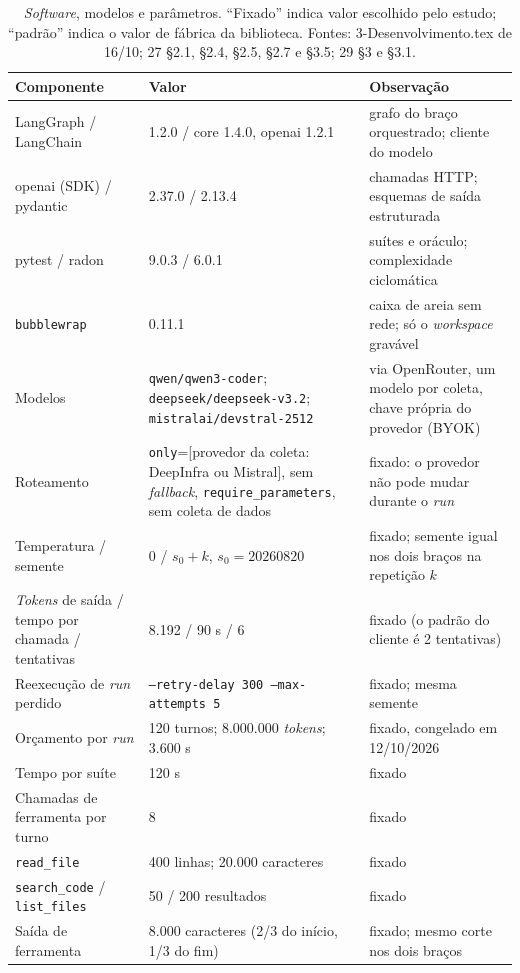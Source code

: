 \begin{table}[t]
\centering
\caption{\textit{Software}, modelos e parâmetros. ``Fixado'' indica valor escolhido pelo estudo; ``padrão'' indica o valor de fábrica da biblioteca. Fontes: 3-Desenvolvimento.tex de 16/10; 27 \S2.1, \S2.4, \S2.5, \S2.7 e \S3.5; 29 \S3 e \S3.1.}
\label{tab-parametros}
\small
\begin{tabular}{p{4.8cm}p{4.6cm}p{5.6cm}}
\toprule
Componente & Valor & Observação \\
\midrule
LangGraph / LangChain & 1.2.0 / core 1.4.0, openai 1.2.1 & grafo do braço orquestrado; cliente do modelo \\
openai (SDK) / pydantic & 2.37.0 / 2.13.4 & chamadas HTTP; esquemas de saída estruturada \\
pytest / radon & 9.0.3 / 6.0.1 & suítes e oráculo; complexidade ciclomática \\
\texttt{bubblewrap} & 0.11.1 & caixa de areia sem rede; só o \textit{workspace} gravável \\
Modelos & \texttt{qwen/qwen3-coder}; \texttt{deepseek/deepseek-v3.2}; \texttt{mistralai/devstral-2512} & via OpenRouter, um modelo por coleta, chave própria do provedor (BYOK) \\
Roteamento & \texttt{only}=[provedor da coleta: DeepInfra ou Mistral], sem \textit{fallback}, \texttt{require\_parameters}, sem coleta de dados & fixado: o provedor não pode mudar durante o \textit{run} \\
Temperatura / semente & 0 / $s_0 + k$, $s_0 = 20260820$ & fixado; semente igual nos dois braços na repetição $k$ \\
\textit{Tokens} de saída / tempo por chamada / tentativas & 8.192 / 90 s / 6 & fixado (o padrão do cliente é 2 tentativas) \\
Reexecução de \textit{run} perdido & \texttt{--retry-delay 300 --max-attempts 5} & fixado; mesma semente \\
Orçamento por \textit{run} & 120 turnos; 8.000.000 \textit{tokens}; 3.600 s & fixado, congelado em 12/10/2026 \\
Tempo por suíte & 120 s & fixado \\
Chamadas de ferramenta por turno & 8 & fixado \\
\texttt{read\_file} & 400 linhas; 20.000 caracteres & fixado \\
\texttt{search\_code} / \texttt{list\_files} & 50 / 200 resultados & fixado \\
Saída de ferramenta & 8.000 caracteres (2/3 do início, 1/3 do fim) & fixado; mesmo corte nos dois braços \\

\end{tabular}
\end{table}
